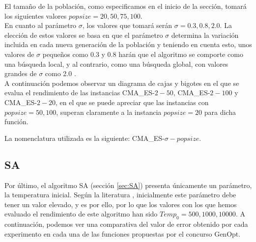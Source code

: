 El tamaño de la población, como especificamos en el inicio de la sección, tomará los siguientes valores $popsize = 20, 50, 75, 100$. \\
En cuanto al parámetro $\sigma$, los valores que tomará serán $\sigma = 0.3, 0.8, 2.0$. La elección de estos valores se basa en que el parámetro $\sigma$ determina la variación incluida en cada nueva generación de la población y teniendo en cuenta esto, unos valores de $\sigma$ pequeños como 0.3 y 0.8 harán que el algoritmo se comporte como una búsqueda local, y al contrario, como una búsqueda global, con valores grandes de $\sigma$ como 2.0 \cite{CMA1}. \\

A continuación podemos observar un diagrama de cajas y bigotes en el que se evalua el rendimiento de las instancias CMA\_ES-$2-50$, CMA\_ES-$2-100$ y CMA\_ES-$2-20$, en el que se puede apreciar que las instancias con $popsize = 50, 100$, superan claramente a la instancia $popsize = 20$ para dicha función.

La nomenclatura utilizada es la siguiente: CMA\_ES-$\sigma-popsize$.

\newpage

\subsection{SA}\label{sec:paramSA}

Por último, el algoritmo SA (sección \ref{sec:SA}) presenta únicamente un parámetro, la temperatura inicial. Según la literatura \cite{metabook}, inicialmente este parámetro debe tener un valor elevado, y es por ello, por lo que los valores con los que hemos evaluado el rendimiento de este algoritmo han sido $Temp_{0} = 500, 1000, 10000$. A continuación, podemos ver una comparativa del valor de error obtenido por cada experimento en cada una de las funciones propuestas por el concurso GenOpt. 

